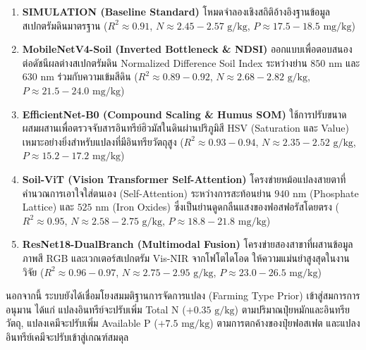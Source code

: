\documentclass[12pt,a4paper,oneside]{book}
\begin{document}
\begin{enumerate}
    \item \textbf{SIMULATION (Baseline Standard)} โหมดจำลองเชิงสถิติอ้างอิงฐานข้อมูลสเปกตรัมดินมาตรฐาน ($R^2 \approx 0.91$, $N \approx 2.45 - 2.57\text{ g/kg}$, $P \approx 17.5 - 18.5\text{ mg/kg}$)
    
    \item \textbf{MobileNetV4-Soil (Inverted Bottleneck \& NDSI)} ออกแบบเพื่อตอบสนองต่อดัชนีผลต่างสเปกตรัมดิน Normalized Difference Soil Index ระหว่างย่าน $850\text{ nm}$ และ $630\text{ nm}$ ร่วมกับความเข้มสีดิน ($R^2 \approx 0.89 - 0.92$, $N \approx 2.68 - 2.82\text{ g/kg}$, $P \approx 21.5 - 24.0\text{ mg/kg}$)
    
    \item \textbf{EfficientNet-B0 (Compound Scaling \& Humus SOM)} ใช้การปรับขนาดผสมผสานเพื่อตรวจจับสารอินทรีย์ฮิวมัสในดินผ่านปริภูมิสี HSV (Saturation และ Value) เหมาะอย่างยิ่งสำหรับแปลงที่มีอินทรียวัตถุสูง ($R^2 \approx 0.93 - 0.94$, $N \approx 2.35 - 2.52\text{ g/kg}$, $P \approx 15.2 - 17.2\text{ mg/kg}$)
    
    \item \textbf{Soil-ViT (Vision Transformer Self-Attention)} โครงข่ายหม้อแปลงสายตาที่คำนวณการเอาใจใส่ตนเอง (Self-Attention) ระหว่างการสะท้อนย่าน $940\text{ nm}$ (Phosphate Lattice) และ $525\text{ nm}$ (Iron Oxides) ซึ่งเป็นย่านดูดกลืนแสงของฟอสฟอรัสโดยตรง ($R^2 \approx 0.95$, $N \approx 2.58 - 2.75\text{ g/kg}$, $P \approx 18.8 - 21.8\text{ mg/kg}$)
    
    \item \textbf{ResNet18-DualBranch (Multimodal Fusion)} โครงข่ายสองสาขาที่ผสานข้อมูลภาพสี RGB และเวกเตอร์สเปกตรัม Vis-NIR จากโฟโตไดโอด ให้ความแม่นยำสูงสุดในงานวิจัย ($R^2 \approx 0.96 - 0.97$, $N \approx 2.75 - 2.95\text{ g/kg}$, $P \approx 23.0 - 26.5\text{ mg/kg}$)
\end{enumerate}

นอกจากนี้ ระบบยังได้เชื่อมโยงสมมติฐานการจัดการแปลง (Farming Type Prior) เข้าสู่สมการการอนุมาน ได้แก่ แปลงอินทรีย์จะปรับเพิ่ม Total N ($+0.35\text{ g/kg}$) ตามปริมาณปุ๋ยหมักและอินทรียวัตถุ, แปลงเคมีจะปรับเพิ่ม Available P ($+7.5\text{ mg/kg}$) ตามการตกค้างของปุ๋ยฟอสเฟต และแปลงอินทรีย์เคมีจะปรับเข้าสู่เกณฑ์สมดุล
\end{document}
